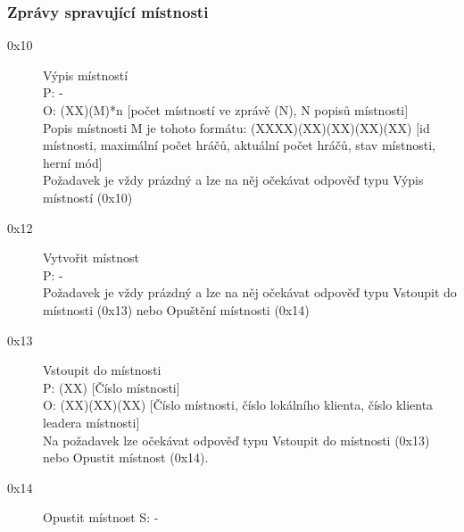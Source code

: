 \documentclass[12pt,a4paper]{article}
\begin{document}
\subsubsection*{Zprávy spravující místnosti}
\begin{description}
\item[0x10] Výpis místností \\
P: - \\
O: (XX)(M)*n [počet místností ve zprávě (N), N popisů místnosti] \\
Popis místnosti M je tohoto formátu: (XXXX)(XX)(XX)(XX)(XX) [id místnosti, maximální počet hráčů, aktuální počet hráčů, stav místnosti, herní mód] \\
Požadavek je vždy prázdný a lze na něj očekávat odpověď typu Výpis místností (0x10)
\item[0x12] Vytvořit místnost \\
P: - \\
Požadavek je vždy prázdný a lze na něj očekávat odpověď typu Vstoupit do místnosti (0x13) nebo Opuštění místnosti (0x14)
\item[0x13] Vstoupit do místnosti\\
P: (XX) [Číslo místnosti] \\
O: (XX)(XX)(XX) [Číslo místnosti, číslo lokálního klienta, číslo klienta leadera místnosti] \\
Na požadavek lze očekávat odpověď typu Vstoupit do místnosti (0x13) nebo Opustit místnost (0x14).
\item[0x14] Opustit místnost
S: -
\end{description}
\end{document}
